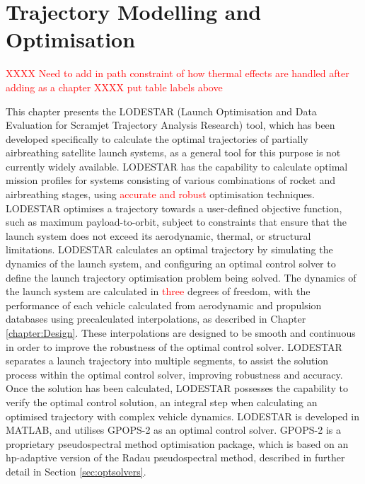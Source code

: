 
\cleardoublepage
\chapter{Trajectory Modelling and Optimisation}\label{chapter:LODESTAR}
	
	\textcolor{red}{XXXX Need to add in path constraint of how thermal effects are handled after adding as a chapter}
		\textcolor{red}{XXXX put table labels above}
			
This chapter presents the LODESTAR (Launch Optimisation and Data Evaluation for Scramjet Trajectory Analysis Research) tool, which has been developed specifically to calculate the optimal trajectories of partially airbreathing satellite launch systems, as a general tool for this purpose is not currently widely available. LODESTAR has the capability to calculate optimal mission profiles for systems consisting of various combinations of rocket and airbreathing stages, using \textcolor{red}{accurate and robust} optimisation techniques. 
LODESTAR optimises a trajectory towards a user-defined objective function, such as maximum payload-to-orbit, subject to constraints that ensure that the launch system does not exceed its aerodynamic, thermal, or structural limitations.
LODESTAR calculates an optimal trajectory by simulating the dynamics of the launch system, and configuring an optimal control solver to define the launch trajectory optimisation problem being solved. 
The dynamics of the launch system are calculated in \textcolor{red}{three} degrees of freedom, with the performance of each vehicle calculated from aerodynamic and propulsion databases using precalculated interpolations, as described in Chapter \ref{chapter:Design}. These interpolations are designed to be smooth and continuous in order to improve the robustness of the optimal control solver.
LODESTAR separates a launch trajectory into multiple segments, to assist the solution process within the optimal control solver, improving robustness and accuracy. 
Once the solution has been calculated, LODESTAR possesses the capability to verify the optimal control solution, an integral step when calculating an optimised trajectory with complex vehicle dynamics. 
LODESTAR is developed in MATLAB, and utilises GPOPS-2\cite{Patterson2015} as an optimal control solver. GPOPS-2 is a proprietary pseudospectral method optimisation package, which is based on an \textsf{hp}-adaptive version of the Radau pseudospectral method, described in further detail in Section \ref{sec:optsolvers}. 


